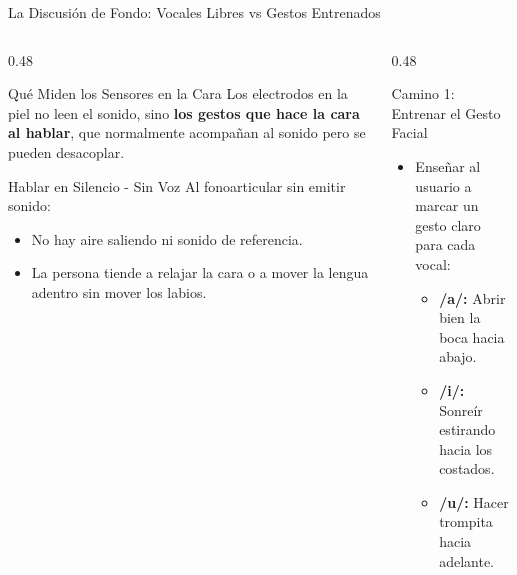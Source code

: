 \begin{frame}{La Discusión de Fondo: Vocales Libres vs Gestos Entrenados}
    \begin{columns}[t]
        \begin{column}{0.48\textwidth}
            \scriptsize
            \begin{block}{Qué Miden los Sensores en la Cara}
                Los electrodos en la piel no leen el sonido, sino \textbf{los gestos que hace la cara al hablar}, que normalmente acompañan al sonido pero se pueden desacoplar.
            \end{block}
            \vspace{0.04cm}
            \begin{alertblock}{Hablar en Silencio - Sin Voz}
                Al fonoarticular sin emitir sonido:
                \begin{itemize}\setlength{\itemsep}{1pt}\setlength{\parskip}{0pt}
                    \item No hay aire saliendo ni sonido de referencia.
                    \item La persona tiende a relajar la cara o a mover la lengua adentro sin mover los labios.
                \end{itemize}
            \end{alertblock}
        \end{column}
        \begin{column}{0.48\textwidth}
            \scriptsize
            \begin{exampleblock}{Camino 1: Entrenar el Gesto Facial}
                \begin{itemize}\setlength{\itemsep}{1pt}\setlength{\parskip}{0pt}
                    \item Enseñar al usuario a marcar un gesto claro para cada vocal:
                    \begin{itemize}\setlength{\itemsep}{0pt}\setlength{\parskip}{0pt}
                        \item \textbf{/a/:} Abrir bien la boca hacia abajo.
                        \item \textbf{/i/:} Sonreír estirando hacia los costados.
                        \item \textbf{/u/:} Hacer trompita hacia adelante.

\end{itemize}
\end{itemize}
\end{exampleblock}
\end{column}
\end{columns}
\end{frame}

